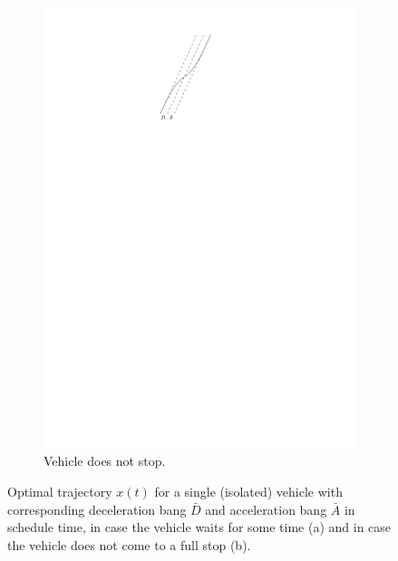 \documentclass[a4paper]{article}
\theoremstyle{definition}
\theoremstyle{plain}
\begin{document}
\begin{figure}[t]
\begin{subfigure}{0.3\textwidth}
    \includegraphics[scale=1]{figures/motion/single_trajectory_merged}
    \caption{Vehicle does not stop.}
    \label{fig:single_trajectory_merge}
\end{subfigure}
\caption{Optimal trajectory $x(t)$ for a single (isolated) vehicle with
  corresponding deceleration bang $\bar{D}$ and acceleration bang $\bar{A}$ in
  schedule time, in case the vehicle waits for some time (a) and in case the
  vehicle does not come to a full stop (b).}
  \label{fig:single_trajectory}
\end{figure}
\end{document}
